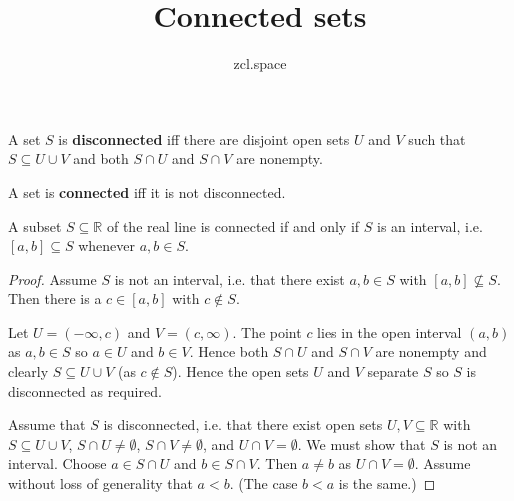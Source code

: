 \documentclass[10pt,a4paper,UTF8]{article}
\author{zcl.space}
\date{}
\title{Connected sets}
\begin{document}
\maketitle
\tableofcontents
\begin{definition}
A set \(S\) is \textbf{disconnected} iff there are disjoint open sets \(U\) and \(V\) such that \(S\subseteq U\cup V\) and both \(S\cap U\) and \(S\cap V\) are nonempty.

A set is \textbf{connected} iff it is not disconnected.
\end{definition}
\begin{tikztheorem}
A subset \(S\subseteq\mathbb{R}\)  of the real line is connected if and only if \(S\) is an interval, i.e.
\([a,b]\subseteq S\) whenever \(a,b\in S\).
\end{tikztheorem}
\begin{proof}
Assume \(S\) is not an interval, i.e. that there exist \(a,b\in S\) with \([a,b]\not\subseteq S\). Then there is a \(c\in[a,b]\) with \(c\notin S\).

Let \(U=(-\infty,c)\) and \(V=(c,\infty)\). The point \(c\) lies in the open interval \((a,b)\) as \(a,b\in S\) so \(a\in U\) and \(b\in V\). Hence both \(S\cap U\) and \(S\cap V\) are nonempty and clearly \(S\subseteq U\cup V\) (as \(c\notin S\)). Hence the open sets \(U\) and \(V\) separate \(S\)
so \(S\) is disconnected as required.

 Assume that \(S\) is disconnected, i.e. that there exist open sets \(U,V\subseteq\mathbb{R}\) with \(S\subseteq U\cup V\), \(S\cap U\ne\emptyset\), \(S\cap V\ne\emptyset\), and  \(U\cap V=\emptyset\). We must show that \(S\) is not an interval. Choose \(a\in S\cap U\) and \(b\in S\cap V\). Then \(a\ne b\) as \(U\cap V=\emptyset\). Assume without loss of generality that \(a < b\).
(The case \(b < a\) is the same.)


\end{proof}
\end{document}
